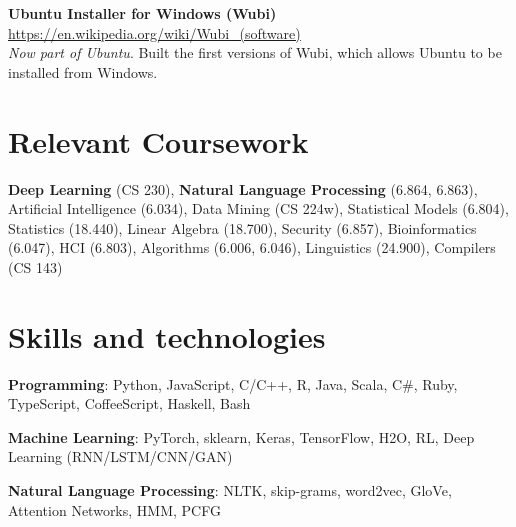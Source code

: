 \documentclass[margin,line]{resume}
\begin{document}
\begin{resume}
\vspace{-6.5mm}

\textbf{Ubuntu Installer for Windows (Wubi)} \hfill \url{https://en.wikipedia.org/wiki/Wubi_(software)}\\ %
\emph{Now part of Ubuntu}. Built the first versions of Wubi, which allows Ubuntu to be installed from Windows. %

\section{\mysidestyle Relevant Coursework}

\textbf{Deep Learning} (CS 230), \textbf{Natural Language Processing} (6.864, 6.863), Artificial Intelligence (6.034), Data Mining (CS 224w), Statistical Models (6.804), Statistics (18.440), Linear Algebra (18.700), Security (6.857), Bioinformatics (6.047), HCI (6.803), Algorithms (6.006, 6.046), Linguistics (24.900), Compilers (CS 143)

\section{\mysidestyle Skills and technologies}

\textbf{Programming}: Python, JavaScript, C/C++, R, Java, Scala, C\#, Ruby, TypeScript, CoffeeScript, Haskell, Bash

\vspace{-4mm}



\textbf{Machine Learning}: PyTorch, sklearn, Keras, TensorFlow, H2O, RL, Deep Learning (RNN/LSTM/CNN/GAN) %


\vspace{-4mm}

\textbf{Natural Language Processing}: NLTK, skip-grams, word2vec, GloVe, Attention Networks, HMM, PCFG %


\end{resume}
\end{document}
